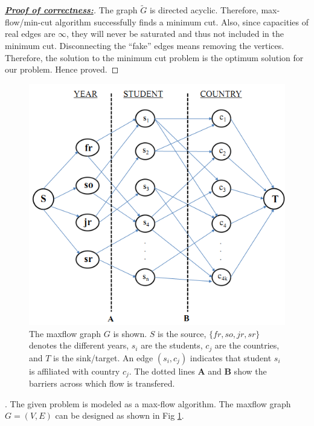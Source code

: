 \documentclass[assign]{article}
\begin{document}
\begin{proof}[\underline{\textbf{Proof of correctness:}}]
   The graph $\tilde{G}$ is directed acyclic. Therefore, max-flow/min-cut algorithm successfully finds a minimum cut. Also, since capacities of real edges are $\infty$, they will never be saturated and thus not included in the minimum cut. Disconnecting the ``fake'' edges means removing the vertices. Therefore, the solution to the minimum cut problem is the optimum solution for our problem. Hence proved.
\end{proof}

\begin{figure}[!hbt]
\begin{center}
  \includegraphics[width=0.9\linewidth]{fig4.png}
\end{center}
\vspace{-10pt}
  \caption{\small{ The maxflow graph $G$ is shown. $S$ is the source, $\{fr,so,jr,sr\}$ denotes the different years, $s_i$ are the students, $c_j$ are the countries, and $T$ is the sink/target. An edge $(s_i,c_j)$ indicates that student $s_i$ is affiliated with country $c_j$. The dotted lines \textbf{A} and \textbf{B} show the barriers across which flow is transfered. } }
  \label{fig4}
\end{figure}

. The given problem is modeled as a max-flow algorithm. The maxflow graph $G=(V,E)$ can be designed as shown in Fig \ref{fig4}. 
\end{document}
